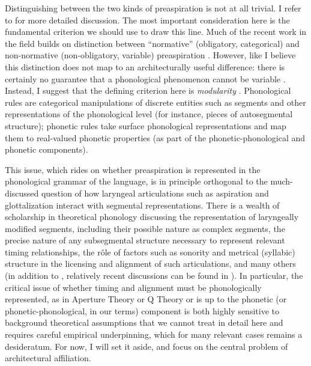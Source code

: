 \documentclass[output=paper,colorlinks,citecolor=brown]{langscibook}
\begin{document}
Distinguishing between the two kinds of preaspiration is not at all trivial. I refer to \textcite{iosad2020phonological} for more detailed discussion. The most important consideration here is the fundamental criterion we should use to draw this line. Much of the recent work in the field builds on  distinction between \enquote{normative} (obligatory, categorical) and non\hyp normative (non\hyp obligatory, variable) preaspiration \parencite[cf.][]{hansson2001remains, blevins2017areal}. However, like  I believe this distinction does not map to an architecturally useful difference: there is certainly no guarantee that a phonological phenomenon cannot be variable \parencite{cohn06:_is, fruehwald2021oxhop}. Instead, I suggest that the defining criterion here is \emph{modularity} \parencite[cf.][]{iosad2017phonologization}. Phonological rules are categorical manipulations of discrete entities such as segments and other representations of the phonological level (for instance, pieces of autosegmental structure); phonetic rules take surface phonological representations and map them to real\hyp valued phonetic properties (as part of the phonetic-phonological and phonetic components).

This issue, which rides on whether preaspiration is represented in the phonological grammar of the language, is in principle orthogonal to the much\hyp discussed question of how laryngeal articulations such as aspiration and glottalization interact with segmental representations. There is a wealth of scholarship in theoretical phonology discussing the representation of laryngeally modified segments, including their possible nature as complex segments, the precise nature of any subsegmental structure necessary to represent relevant timing relationships, the rôle of factors such as sonority and metrical (syllabic) structure in the licensing and alignment of such articulations, and many others (in addition to , relatively recent discussions can be found in \cites{steriade1993segments}{howe2001patterns}{Davis2003}{kehrein04}{golston2013}). In particular, the critical issue of whether timing and alignment must be phonologically represented, as in Aperture Theory \parencite{steriade1993segments} or Q Theory \parencite{inkelas2017looking} or is up to the phonetic (or phonetic\hyp phonological, in our terms) component \parencite[e.\,g.][]{howe2001patterns} is both highly sensitive to background theoretical assumptions that we cannot treat in detail here and requires careful empirical underpinning, which for many relevant cases remains a desideratum. For now, I will set it aside, and focus on the central problem of architectural affiliation.
\end{document}
